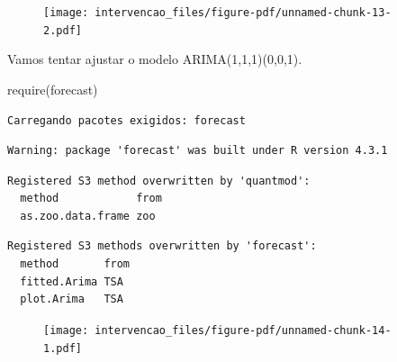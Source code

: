 \documentclass[
  letterpaper,
  DIV=11,
  numbers=noendperiod]{scrartcl}
\newenvironment{Shaded}{\begin{snugshade}}{\end{snugshade}}
\newcommand{\DecValTok}[1]{\textcolor[rgb]{0.68,0.00,0.00}{#1}}
\newcommand{\FunctionTok}[1]{\textcolor[rgb]{0.28,0.35,0.67}{#1}}
\newcommand{\NormalTok}[1]{\textcolor[rgb]{0.00,0.23,0.31}{#1}}
\newcommand{\OtherTok}[1]{\textcolor[rgb]{0.00,0.23,0.31}{#1}}
\newcommand{\SpecialCharTok}[1]{\textcolor[rgb]{0.37,0.37,0.37}{#1}}
\theoremstyle{plain}
\theoremstyle{plain}
\theoremstyle{definition}
\theoremstyle{definition}
\theoremstyle{remark}
\begin{document}
\begin{figure}[H]

{\centering \texttt{[image: intervencao\_files/figure-pdf/unnamed-chunk-13-2.pdf]}

}

\end{figure}

Vamos tentar ajustar o modelo ARIMA(1,1,1)(0,0,1).

\begin{Shaded}
\begin{Highlighting}[]
\FunctionTok{require}\NormalTok{(forecast)}
\end{Highlighting}
\end{Shaded}

\begin{verbatim}
Carregando pacotes exigidos: forecast
\end{verbatim}

\begin{verbatim}
Warning: package 'forecast' was built under R version 4.3.1
\end{verbatim}

\begin{verbatim}
Registered S3 method overwritten by 'quantmod':
  method            from
  as.zoo.data.frame zoo 
\end{verbatim}

\begin{verbatim}
Registered S3 methods overwritten by 'forecast':
  method       from
  fitted.Arima TSA 
  plot.Arima   TSA 
\end{verbatim}

\begin{Shaded}
\end{Shaded}

\begin{figure}[H]

{\centering \texttt{[image: intervencao\_files/figure-pdf/unnamed-chunk-14-1.pdf]}

}

\end{figure}
\end{document}
